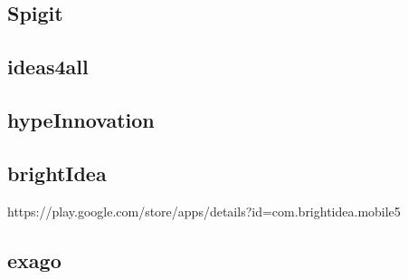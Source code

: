 \subsection{Spigit}
\subsection{ideas4all}
\subsection{hypeInnovation}
\subsection{brightIdea}
https://play.google.com/store/apps/details?id=com.brightidea.mobile5
\subsection{exago}

